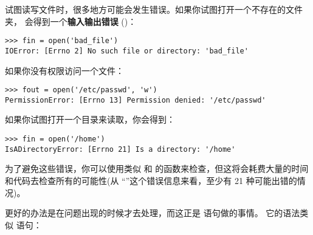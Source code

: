 {{{{{{{%

试图读写文件时，很多地方可能会发生错误。如果你试图打开一个不存在的文件夹，
会得到一个{\bf 输入输出错误} ()：

  
  

\begin{lstlisting}
>>> fin = open('bad_file')
IOError: [Errno 2] No such file or directory: 'bad_file'
\end{lstlisting}

%

如果你没有权限访问一个文件：

  

\begin{lstlisting}
>>> fout = open('/etc/passwd', 'w')
PermissionError: [Errno 13] Permission denied: '/etc/passwd'
\end{lstlisting}

%

如果你试图打开一个目录来读取，你会得到：

\begin{lstlisting}
>>> fin = open('/home')
IsADirectoryError: [Errno 21] Is a directory: '/home'
\end{lstlisting}

%

为了避免这些错误，你可以使用类似  和  的函数来检查，但这将会耗费大量的时间和代码去检查所有的可能性(从 ``''这个错误信息来看，至少有 21 种可能出错的情况)。

  


更好的办法是在问题出现的时候才去处理，而这正是  语句做的事情。
它的语法类似  语句：

}}}}}}}
